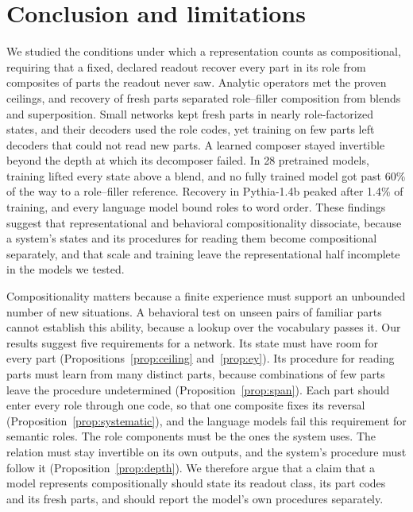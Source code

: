\documentclass[10pt]{article}
\theoremstyle{plain}
\theoremstyle{remark}
\begin{document}
\section{Conclusion and limitations}
\label{sec:discussion}

We studied the conditions under which a representation counts as compositional, requiring that a fixed, declared readout recover every part in its role from composites of parts the readout never saw. Analytic operators met the proven ceilings, and recovery of fresh parts separated role--filler composition from blends and superposition. Small networks kept fresh parts in nearly role-factorized states, and their decoders used the role codes, yet training on few parts left decoders that could not read new parts. A learned composer stayed invertible beyond the depth at which its decomposer failed. In 28 pretrained models, training lifted every state above a blend, and no fully trained model got past 60\% of the way to a role--filler reference. Recovery in Pythia-1.4b peaked after 1.4\% of training, and every language model bound roles to word order. These findings suggest that representational and behavioral compositionality dissociate, because a system's states and its procedures for reading them become compositional separately, and that scale and training leave the representational half incomplete in the models we tested.

Compositionality matters because a finite experience must support an unbounded number of new situations. A behavioral test on unseen pairs of familiar parts cannot establish this ability, because a lookup over the vocabulary passes it. Our results suggest five requirements for a network. Its state must have room for every part (Propositions~\ref{prop:ceiling} and~\ref{prop:ey}). Its procedure for reading parts must learn from many distinct parts, because combinations of few parts leave the procedure undetermined (Proposition~\ref{prop:span}). Each part should enter every role through one code, so that one composite fixes its reversal (Proposition~\ref{prop:systematic}), and the language models fail this requirement for semantic roles. The role components must be the ones the system uses. The relation must stay invertible on its own outputs, and the system's procedure must follow it (Proposition~\ref{prop:depth}). We therefore argue that a claim that a model represents compositionally should state its readout class, its part codes and its fresh parts, and should report the model's own procedures separately.
\end{document}
